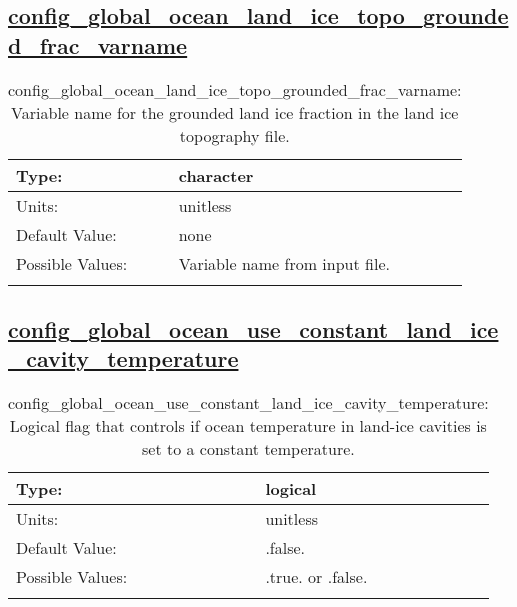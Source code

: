 \subsection[config\_global\_ocean\_land\_ice\_topo\_grounded\_frac\_varname]{\hyperref[sec:nm_tab_global_ocean]{config\_global\_ocean\_land\_ice\_topo\_grounded\_frac\_varname}}
\label{subsec:nm_sec_config_global_ocean_land_ice_topo_grounded_frac_varname}
\begin{center}
\begin{longtable}{| p{2.0in} || p{4.0in} |}
    \hline
    Type: & character \\
    \hline
    Units: & \si{unitless} \\
    \hline
    Default Value: & none \\
    \hline
    Possible Values: & Variable name from input file. \\
    \hline
    \caption{config\_global\_ocean\_land\_ice\_topo\_grounded\_frac\_varname: Variable name for the grounded land ice fraction in the land ice topography file.}
\end{longtable}
\end{center}
\subsection[config\_global\_ocean\_use\_constant\_land\_ice\_cavity\_temperature]{\hyperref[sec:nm_tab_global_ocean]{config\_global\_ocean\_use\_constant\_land\_ice\_cavity\_temperature}}
\label{subsec:nm_sec_config_global_ocean_use_constant_land_ice_cavity_temperature}
\begin{center}
\begin{longtable}{| p{2.0in} || p{4.0in} |}
    \hline
    Type: & logical \\
    \hline
    Units: & \si{unitless} \\
    \hline
    Default Value: & .false. \\
    \hline
    Possible Values: & .true. or .false. \\
    \hline
    \caption{config\_global\_ocean\_use\_constant\_land\_ice\_cavity\_temperature: Logical flag that controls if ocean temperature in land-ice cavities is set to a constant temperature.}
\end{longtable}
\end{center}
